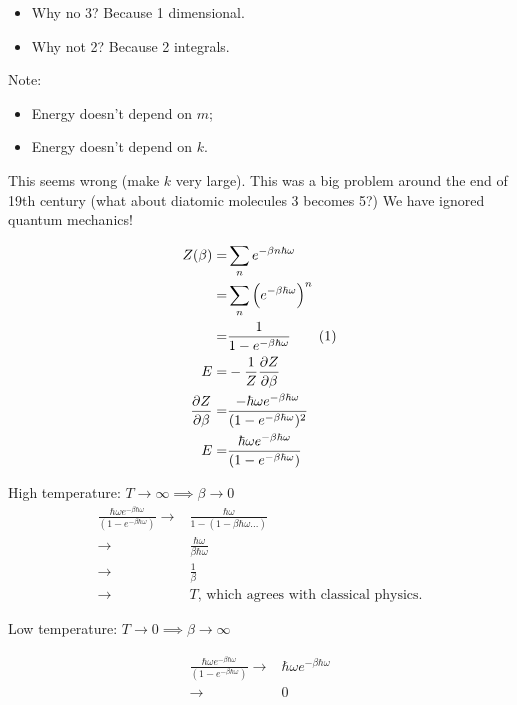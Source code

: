 \documentclass[]{article}
\newcommand\numberthis{\addtocounter{equation}{1}\tag{\theequation}}
\begin{document}
\begin{itemize}
	\item Why no 3? Because 1 dimensional.
	\item Why not 2? Because 2 integrals.
\end{itemize}

Note:
\begin{itemize}
	\item Energy doesn't depend on $m$;
	\item Energy doesn't depend on $k$.
\end{itemize}

This seems wrong (make $k$ very large). This was a big problem around the end of 19th century (what about diatomic molecules 3 becomes 5?) We have ignored quantum mechanics!

\begin{align*}
	Z(\beta) =& \sum_{n} e^{- \beta n \hbar \omega}\\
	 =& \sum_{n} \Big(e^{- \beta\hbar \omega}\Big)^n\\
	 =& \frac{1}{1 - e^{- \beta\hbar \omega}}\numberthis\label{Z_quantum_shm}\\
	 E =& - \frac{1}{Z} \frac{\partial Z}{\partial \beta}\\
	 \frac{\partial Z}{\partial \beta}=& \frac{- \hbar \omega e^{- \beta\hbar \omega}}{(1 - e^{- \beta\hbar \omega})^2}\\
	 E =& \frac{ \hbar \omega e^{- \beta\hbar \omega}}{(1 - e^{- \beta\hbar \omega})}
\end{align*}

High temperature: $T\rightarrow\infty \implies \beta \rightarrow 0$
\begin{align*}
	\frac{ \hbar \omega e^{- \beta\hbar \omega}}{(1 - e^{- \beta\hbar \omega})}\rightarrow& \frac{\hbar \omega}{1 -(1 - \beta \hbar \omega...)}\\
	\rightarrow& \frac{\hbar \omega}{\beta \hbar \omega}\\
	\rightarrow& \frac{1}{\beta}\\
	\rightarrow& T\text{, which agrees with classical physics.}
\end{align*}

Low temperature: $T\rightarrow 0 \implies \beta \rightarrow \infty$

\begin{align*}
\frac{ \hbar \omega e^{- \beta\hbar \omega}}{(1 - e^{- \beta\hbar \omega})}\rightarrow&\hbar \omega e^{- \beta\hbar \omega}\\
\rightarrow&0
\end{align*}
\end{document}
